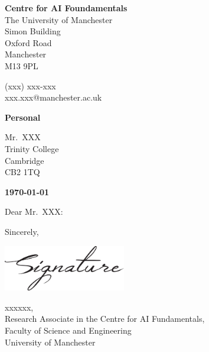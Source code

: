 \documentclass[12pt, a4paper]{letter} %
\begin{document}
\begin{minipage}[t]{0.3\textwidth}
\end{minipage}
\hfill
\begin{minipage}[t]{0.65\textwidth}\raggedright
\raggedleft
\small{
\textbf{\color{uompurple}Centre for AI Foundamentals}\\
\vspace{0.5em}
The University of Manchester\\
Simon Building\\
Oxford Road\\
Manchester\\
M13 9PL

\vspace{0.5em}

(xxx) xxx-xxx\\
xxx.xxx@manchester.ac.uk}
\end{minipage}

\vspace{1em}

\textbf{Personal}

Mr.~XXX\\
Trinity College\\
Cambridge\\
CB2 1TQ

\textbf{\today}

Dear Mr.~XXX:

\lipsum[1-3]

Sincerely,

\includegraphics[width=2.1in]{signature}

xxxxxx,\\
Research Associate in the Centre for AI Fundamentals,\\
Faculty of Science and Engineering\\
University of Manchester
\end{document}
